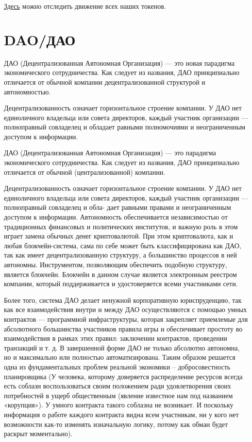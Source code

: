 \documentclass[a4paper,12pt]{report}
\newcommand{\contractAddress}{0x37d29cb7d543300063a50d85389d409c01da7945}
\begin{document}
\href{https://etherscan.io/address/\contractAddress}{Здесь} можно отследить движение всех наших токенов.



\section{DAO/ДАО}
\label{dao}

ДАО (Децентрализованная Автономная Организация) — это новая парадигма экономического сотрудничества. Как следует из названия, ДАО принципиально отличается от обычной компании децентрализованной структурой и автономностью.

Децентрализованность означает горизонтальное строение компании. У ДАО нет единоличного владельца или совета директоров, каждый участник организации — полноправный совладелец и обладает равными полномочиями и неограниченным доступом к информации.

ДАО (Децентрализованная Автономная Организация) — это парадигма экономического сотрудничества. Как следует из названия, ДАО принципиально отличается от обычной (централизованной) компании.

Децентрализованность означает горизонтальное строение компании. У ДАО нет единоличного владельца или совета директоров, каждый участник организации — полноправный совладелец и обла- дает равными правами и неограниченным доступом к информации.
Автономность обеспечивается независимостью от традиционных финансовых и политических институтов, и важную роль в этом играет замена обычных денег криптовалютой. При этом криптовалюта, как и любая блокчейн-система, сама по себе может быть классифицирована как ДАО, так как имеет децентрализованную структуру, а большинство процессов в ней автономны.
Инструментом, позволяющим обеспечить подобную структуру, является блокчейн. Блокчейн в данном случае является электронным реестром компании, который поддерживается и удостоверяется всеми участниками сети.

Более того, система ДАО делает ненужной корпоративную юриспруденцию, так как все взаимодействия внутри и между ДАО осуществляются с помощью умных контрактов — программной инфраструктуры, которая закрепляет приемлемые для абсолютного большинства участников правила игры и обеспечивает простоту во взаимодействия в рамках этих правил: заключении контрактов, проведении транзакций и т. д. В завершенной форме ДАО не только абсолютно автономна, но и максимально или полностью автоматизирована. Таким образом решается одна из фундаментальных проблем реальной экономики – добросовестность планировщика (У человека, которому доверяется распределение ресурсов всегда есть соблазн воспользоваться своим положением ради удовлетворения своих потребностей в ущерб общественным (явление известное нам под названием «корупция»). У умного контракта такого соблазна не возникает. И поскольку информация о работе каждого контракта видна всем участникам, ни у кого нет возможности как-то изменять изначальную логику, потому как обман будет раскрыт моментально).  
\end{document}
